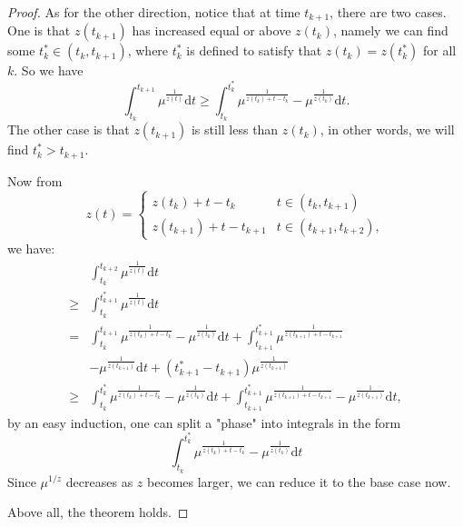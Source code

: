 \documentclass[12pt,abstract=true]{scrartcl}
\numberwithin{equation}{section}
\theoremstyle{definition}   \newtheorem{definition}{Definition}[section]
\theoremstyle{plain}        \newtheorem{theorem}{Theorem}[section]
\theoremstyle{plain}        \newtheorem{observation}{Observation}[section]
\theoremstyle{plain}        \newtheorem{fact}{Fact}[section]
\theoremstyle{plain}        \newtheorem{claim}{Claim}[section]
\theoremstyle{plain}        \newtheorem{lemma}[theorem]{Lemma}
\theoremstyle{plain}        \newtheorem{corollary}[theorem]{Corollary}
\theoremstyle{remark}       \newtheorem{example}{Example}[section]
\theoremstyle{remark}       \newtheorem{remark}{Remark}[section]
\begin{document}
\begin{proof}
As for the other direction, notice that at time $t_{k+1}$, there are two cases.
One is that $z(t_{k+1})$ has increased equal or above $z(t_k)$, namely we can
find some $t_k^*\in (t_k, t_{k+1})$, where $t_k^*$ is defined to satisfy that
$z(t_k)=z(t_k^*)$ for all $k$. So we have \begin{equation}
\int_{t_k}^{t_{k+1}} \mu^{\frac{1}{z(t)}} \mathrm{d}t \ge \int_{t_k}^{t_k^*}
\mu^{\frac{1}{z(t_k)+t-t_k}} - \mu^{\frac{1}{z(t_{k})}}\mathrm{d}t.
\end{equation}
The other case is that $z(t_{k+1})$ is still less than $z(t_{k})$, in other
words, we will find $t_k^*>t_{k+1}$.  

Now from
\begin{equation}
z(t)=
\begin{cases}
z(t_k)+t-t_k&  t\in (t_k, t_{k+1})\\
z(t_{k+1})+t-t_{k+1}& t\in (t_{k+1}, t_{k+2}),
\end{cases}
\end{equation}
we have:
\begin{equation}
\begin{split}
&\int_{t_k}^{t_{k+2}} \mu^{\frac{1}{z(t)}} \mathrm{d}t\\
\ge{}& \int_{t_k}^{t_{k+1}^*} \mu^{\frac{1}{z(t)}} \mathrm{d}t \\
={}&\int_{t_k}^{t_{k+1}} \mu^{\frac{1}{z(t_k)+t-t_k}} - \mu^{\frac{1}{z(t_{k})}}
\mathrm{d}t+ \int_{t_{k+1}}^{t_{k+1}^*} \mu^{\frac{1}{z(t_{k+1})+t-t_{k+1}}}\\& -
\mu^{\frac{1}{z(t_{k+1})}} \mathrm{d}t + (t_{k+1}^*-t_{k+1})\mu^{\frac{1}{z(t_{k+1})}}\\
\ge{}& \int_{t_k}^{t_{k}^*} \mu^{\frac{1}{z(t_k)+t-t_k}} -
\mu^{\frac{1}{z(t_{k})}}\mathrm{d}t + \int_{t_{k+1}}^{t_{k+1}^*}
\mu^{\frac{1}{z(t_{k+1})+t-t_{k+1}}} - \mu^{\frac{1}{z(t_{k+1})}}\mathrm{d}t,
\end{split}
\end{equation}
by an easy induction, one can split a "phase" into integrals in the form 
\begin{equation}
\int_{t_k}^{t_{k}^*} \mu^{\frac{1}{z(t_k)+t-t_k}} - \mu^{\frac{1}{z(t_{k})}}\mathrm{d}t
\end{equation}
 Since $ \mu^{1/z}$ decreases as $z$ becomes larger, we can reduce it to the base case now.

Above all, the theorem holds.
\end{proof}
\end{document}
